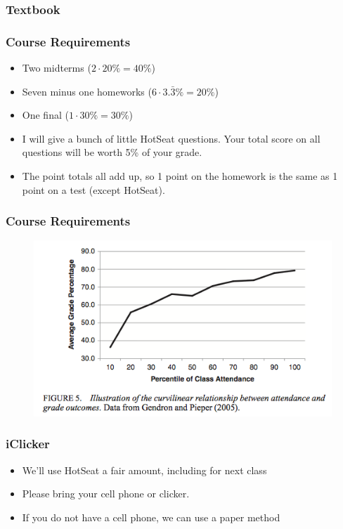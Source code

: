 \documentclass{beamer}
\begin{document}
\begin{frame}
\frametitle[alignment=center]{Textbook}
\end{frame}

\begin{frame}
\frametitle[alignment=center]{Course Requirements}
\begin{itemize}
\item Two midterms ($2\cdot20\%=40\%$)
\bigskip
\item Seven minus one homeworks ($6\cdot3.\bar{3}\%=20\%$)
\bigskip
\item One final ($1\cdot30\%=30\%$)
\bigskip
\item I will give a bunch of little HotSeat questions.  Your total score on all questions will be worth 5\% of your grade.
\bigskip
\item The point totals all add up, so 1 point on the homework is the same as 1 point on a test (except HotSeat).  
\end{itemize}
\end{frame}

\begin{frame}
\frametitle[alignment=center]{Course Requirements}
\begin{figure}
\includegraphics[scale=0.62]{Attendance.png}
\end{figure}
\end{frame}


\begin{frame}
\frametitle[alignment=center]{iClicker}
\begin{itemize}
\item We'll use HotSeat a fair amount, including for next class
\bigskip
\item Please bring your cell phone or clicker.
\bigskip
\item If you do not have a cell phone, we can use a paper method
\end{itemize}
\end{frame}
\end{document}
